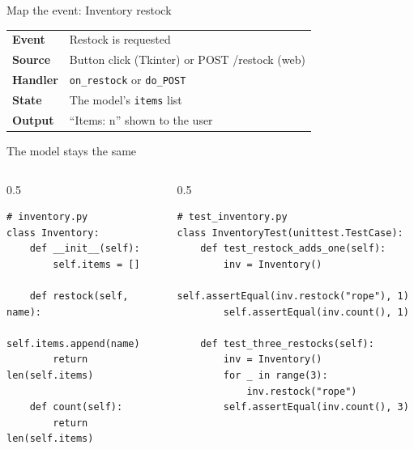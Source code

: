 \documentclass[aspectratio=169]{beamer}
\begin{document}
\begin{frame}{Map the event: Inventory restock}
\begin{center}
\begin{tabular}{@{}ll@{}}
\hline
\textbf{Event} & Restock is requested \\
\textbf{Source} & Button click (Tkinter) or POST /restock (web) \\
\textbf{Handler} & \texttt{on\_restock} or \texttt{do\_POST} \\
\textbf{State} & The model's \texttt{items} list \\
\textbf{Output} & ``Items: n'' shown to the user \\
\hline
\end{tabular}
\end{center}
\end{frame}

\begin{frame}[fragile]{The model stays the same}
\begin{columns}[T]
\begin{column}{0.5\textwidth}
\begin{lstlisting}
# inventory.py
class Inventory:
    def __init__(self):
        self.items = []

    def restock(self, name):
        self.items.append(name)
        return len(self.items)

    def count(self):
        return len(self.items)
\end{lstlisting}
\end{column}
\begin{column}{0.5\textwidth}
\begin{lstlisting}
# test_inventory.py
class InventoryTest(unittest.TestCase):
    def test_restock_adds_one(self):
        inv = Inventory()
        self.assertEqual(inv.restock("rope"), 1)
        self.assertEqual(inv.count(), 1)

    def test_three_restocks(self):
        inv = Inventory()
        for _ in range(3):
            inv.restock("rope")
        self.assertEqual(inv.count(), 3)
\end{lstlisting}
\end{column}
\end{columns}
\end{frame}
\end{document}
